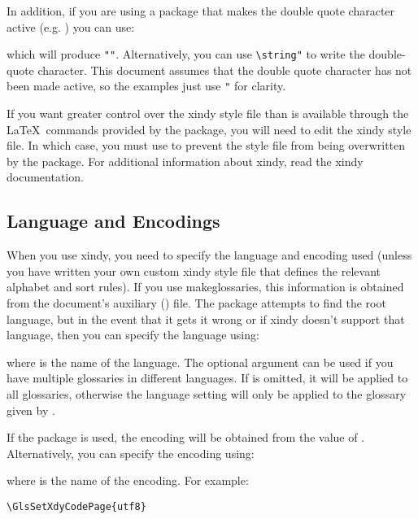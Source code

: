 \documentclass{nlctdoc}
\begin{document}
In addition, if you are using a package that makes the double
quote character active (e.g. ) you can use:
\begin{definition}[\DescribeMacro{\glsquote}]
\end{definition}
which will produce \verb|"|\verb|"|. Alternatively,
you can use \verb|\string"| to write the double-quote character. 
This document assumes that the double quote character has not been
made active, so the examples just use \verb|"| for clarity.

If you want greater control over the \gls{xindy} style file than is
available through the \LaTeX\ commands provided by the
 package, you will need to edit the \gls*{xindy}
style file. In which case, you must use  to prevent the
style file from being overwritten by the 
package. For additional information about \gls*{xindy}, read the
\gls*{xindy} documentation.

\subsection{Language and Encodings}
When you use \gls{xindy}, you need to specify the language
and encoding used (unless you have written your own custom
\gls*{xindy} style file that defines the relevant alphabet
and sort rules). If you use \gls{makeglossaries},
this information is obtained from the document's auxiliary 
() file.  The  package attempts to 
find the root language, but in the event that it gets it wrong or if 
\gls*{xindy} doesn't support that language, then you can
specify the language using:
\begin{definition}[\DescribeMacro{\GlsSetXdyLanguage}]
\end{definition}
where  is the name of the language. The
optional argument can be used if you have multiple glossaries
in different languages. If  is omitted, it
will be applied to all glossaries, otherwise the language
setting will only be applied to the glossary given by
.

If the  package is used, the encoding will be
obtained from the value of . 
Alternatively, you can specify the encoding using:
\begin{definition}[\DescribeMacro{\GlsSetXdyCodePage}]
\end{definition}
where  is the name of the encoding. For example:
\begin{verbatim}
\GlsSetXdyCodePage{utf8}
\end{verbatim}
\end{document}
